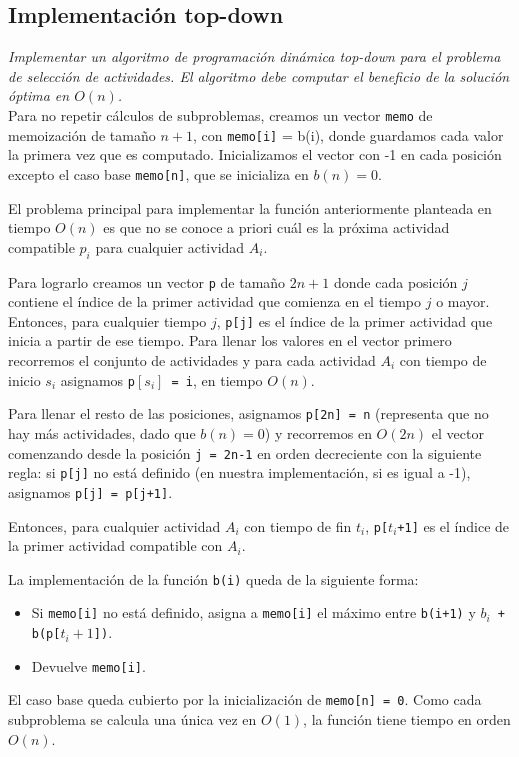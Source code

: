 \documentclass[10pt, a4paper]{article}
\begin{document}
\subsection{Implementación top-down}
\emph{Implementar un algoritmo de programación dinámica top-down para el problema de selección de actividades. El algoritmo debe computar el beneficio de la solución óptima en $O(n)$.} \\

Para no repetir cálculos de subproblemas, creamos un vector \texttt{memo} de memoización de tamaño $n+1$, con \texttt{memo[i]} = b(i), donde guardamos cada valor la primera vez que es computado. Inicializamos el vector con -1 en cada posición excepto el caso base \texttt{memo[n]}, que se inicializa en $b(n) = 0$.

El problema principal para implementar la función anteriormente planteada en tiempo $O(n)$ es que no se conoce a priori cuál es la próxima actividad compatible $p_i$ para cualquier actividad $A_i$.

Para lograrlo creamos un vector \texttt{p} de tamaño $2n+1$ donde cada posición $j$ contiene el índice de la primer actividad que comienza en el tiempo $j$ o mayor. Entonces, para cualquier tiempo $j$, \texttt{p[j]} es el índice de la primer actividad que inicia a partir de ese tiempo. Para llenar los valores en el vector primero recorremos el conjunto de actividades y para cada actividad $A_i$ con tiempo de inicio $s_i$ asignamos \texttt{p$[s_i]$ = i}, en tiempo $O(n)$. 

Para llenar el resto de las posiciones, asignamos \texttt{p[2n] = n} (representa que no hay más actividades, dado que $b(n) = 0$) y recorremos en $O(2n)$ el vector comenzando desde la posición \texttt{j = 2n-1} en orden decreciente con la siguiente regla: si \texttt{p[j]} no está definido (en nuestra implementación, si es igual a -1), asignamos \texttt{p[j] = p[j+1]}.

Entonces, para cualquier actividad $A_i$ con tiempo de fin $t_i$, \texttt{p[$t_i$+1]} es el índice de la primer actividad compatible con $A_i$.

La implementación de la función \texttt{b(i)} queda de la siguiente forma:
\begin{itemize}
    \item Si \texttt{memo[i]} no está definido, asigna a \texttt{memo[i]} el máximo entre \texttt{b(i+1)} y \texttt{$b_i$ + b(p[$t_{i}+1$])}.
    \item Devuelve \texttt{memo[i]}.
\end{itemize}
El caso base queda cubierto por la inicialización de \texttt{memo[n] = 0}. Como cada subproblema se calcula una única vez en $O(1)$, la función tiene tiempo en orden $O(n)$.
\end{document}
